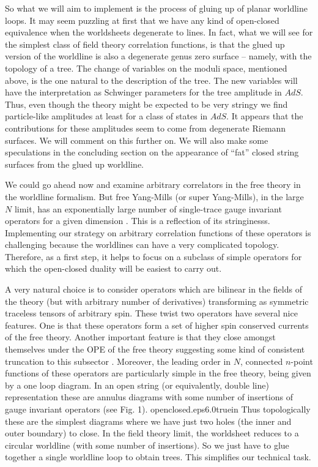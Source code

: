 So what we will aim to implement is the process of gluing up of planar worldline loops. It may 
seem puzzling at first that we have any kind of open-closed equivalence when the worldsheets
degenerate to lines. In fact, what we will see for the simplest class of field theory
correlation functions, is that the glued up version of the worldline 
is also 
a degenerate genus zero surface -- namely, with the topology of a tree.  The change of
variables on the moduli space, mentioned above, is the one natural to the description
of the tree. The new variables will have the interpretation as Schwinger parameters 
for the tree amplitude in $AdS$. Thus, even though the theory might be expected to be very stringy 
we find particle-like amplitudes at least for a class of states in $AdS$. 
It appears that the contributions for these amplitudes seem to come
from degenerate Riemann surfaces. We will comment on this further on. 
We will also make some
speculations in the concluding section on the appearance of ``fat'' closed string surfaces
from the glued up worldline. 

We could go ahead now and examine arbitrary correlators in the free theory in the 
worldline formalism. But free Yang-Mills (or super Yang-Mills),
in the large $N$ limit, has an exponentially large number of 
single-trace gauge invariant operators for a given dimension \sundb \pol . This is a reflection of  
its stringinesss. Implementing our strategy on arbitrary correlation 
functions of these operators is challenging because the worldlines can 
have a very complicated topology. 
Therefore, as a first step, it helps to focus on a subclass of simple 
operators for which the open-closed duality will be easiest to carry out.


A very natural choice is to consider operators 
which are 
bilinear in the fields of the theory (but with arbitrary number of derivatives) 
transforming as symmetric traceless tensors of arbitrary spin. 
These twist two operators have several nice features.
One is that these operators form a 
set of higher spin conserved currents of the free theory. 
Another important feature is that they close 
amongst themselves under the OPE of the free theory
suggesting
some kind of consistent truncation to this subsector \mikh . 
Moreover, the leading order in $N$, connected  
$n$-point functions of these operators are particularly simple in the free theory, 
being given by a one loop diagram. In an open string  
(or equivalently, double line) representation
these are annulus diagrams with some number of insertions of gauge invariant 
operators (see Fig. 1). 
%
{openclosed.eps}{6.0truein}
%
Thus topologically these are the simplest diagrams 
where we have just two holes (the inner and outer boundary) to close. In the field 
theory limit, the worldsheet reduces to a circular worldline (with
some number of insertions). So we just have to glue together a single worldline loop to
obtain trees. This simplifies our technical task.


